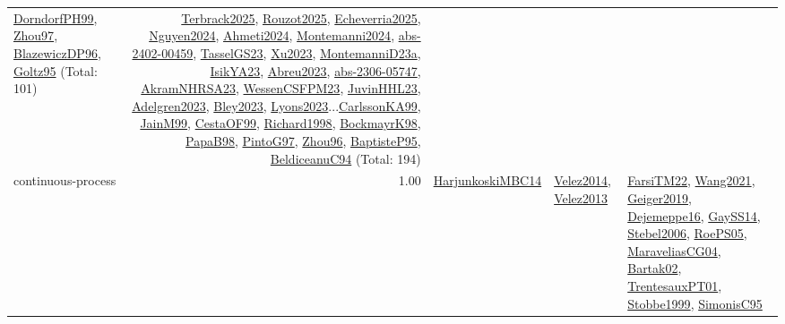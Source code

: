 {\begin{longtable}{p{3cm}r>{\raggedright\arraybackslash}p{6cm}>{\raggedright\arraybackslash}p{6cm}>{\raggedright\arraybackslash}p{8cm}}
\hyperref[detail:DorndorfPH99]{DorndorfPH99}, \hyperref[detail:Zhou97]{Zhou97}, \hyperref[detail:BlazewiczDP96]{BlazewiczDP96}, \hyperref[detail:Goltz95]{Goltz95} (Total: 101) & \hyperref[detail:Terbrack2025]{Terbrack2025}, \hyperref[detail:Rouzot2025]{Rouzot2025}, \hyperref[detail:Echeverria2025]{Echeverria2025}, \hyperref[detail:Nguyen2024]{Nguyen2024}, \hyperref[detail:Ahmeti2024]{Ahmeti2024}, \hyperref[detail:Montemanni2024]{Montemanni2024}, \hyperref[detail:abs-2402-00459]{abs-2402-00459}, \hyperref[detail:TasselGS23]{TasselGS23}, \hyperref[detail:Xu2023]{Xu2023}, \hyperref[detail:MontemanniD23a]{MontemanniD23a}, \hyperref[detail:IsikYA23]{IsikYA23}, \hyperref[detail:Abreu2023]{Abreu2023}, \hyperref[detail:abs-2306-05747]{abs-2306-05747}, \hyperref[detail:AkramNHRSA23]{AkramNHRSA23}, \hyperref[detail:WessenCSFPM23]{WessenCSFPM23}, \hyperref[detail:JuvinHHL23]{JuvinHHL23}, \hyperref[detail:Adelgren2023]{Adelgren2023}, \hyperref[detail:Bley2023]{Bley2023}, \hyperref[detail:Lyons2023]{Lyons2023}...\hyperref[detail:CarlssonKA99]{CarlssonKA99}, \hyperref[detail:JainM99]{JainM99}, \hyperref[detail:CestaOF99]{CestaOF99}, \hyperref[detail:Richard1998]{Richard1998}, \hyperref[detail:BockmayrK98]{BockmayrK98}, \hyperref[detail:PapaB98]{PapaB98}, \hyperref[detail:PintoG97]{PintoG97}, \hyperref[detail:Zhou96]{Zhou96}, \hyperref[detail:BaptisteP95]{BaptisteP95}, \hyperref[detail:BeldiceanuC94]{BeldiceanuC94} (Total: 194)\\
\index{continuous-process}\index{Concepts!continuous-process}continuous-process &  1.00 & \hyperref[detail:HarjunkoskiMBC14]{HarjunkoskiMBC14} & \hyperref[detail:Velez2014]{Velez2014}, \hyperref[detail:Velez2013]{Velez2013} & \hyperref[detail:FarsiTM22]{FarsiTM22}, \hyperref[detail:Wang2021]{Wang2021}, \hyperref[detail:Geiger2019]{Geiger2019}, \hyperref[detail:Dejemeppe16]{Dejemeppe16}, \hyperref[detail:GaySS14]{GaySS14}, \hyperref[detail:Stebel2006]{Stebel2006}, \hyperref[detail:RoePS05]{RoePS05}, \hyperref[detail:MaraveliasCG04]{MaraveliasCG04}, \hyperref[detail:Bartak02]{Bartak02}, \hyperref[detail:TrentesauxPT01]{TrentesauxPT01}, \hyperref[detail:Stobbe1999]{Stobbe1999}, \hyperref[detail:SimonisC95]{SimonisC95}\\

\end{longtable}}
